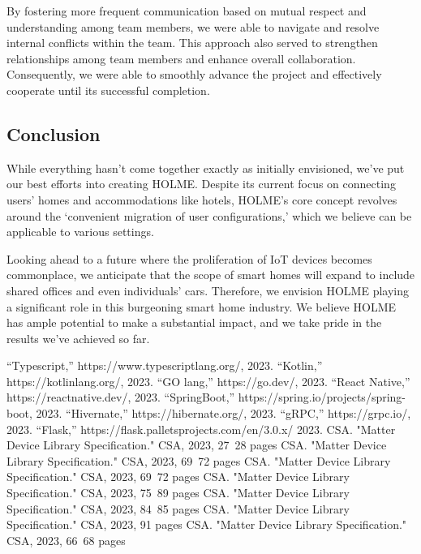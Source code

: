 \documentclass[conference]{IEEEtran}
\begin{document}
By fostering more frequent communication based on mutual respect and understanding among team members, we were able to navigate and resolve internal conflicts within the team. This approach also served to strengthen relationships among team members and enhance overall collaboration. Consequently, we were able to smoothly advance the project and effectively cooperate until its successful completion.\\

\subsection{Conclusion}

While everything hasn't come together exactly as initially envisioned, we've put our best efforts into creating HOLME. Despite its current focus on connecting users' homes and accommodations like hotels, HOLME's core concept revolves around the `convenient migration of user configurations,' which we believe can be applicable to various settings.

Looking ahead to a future where the proliferation of IoT devices becomes commonplace, we anticipate that the scope of smart homes will expand to include shared offices and even individuals' cars. Therefore, we envision HOLME playing a significant role in this burgeoning smart home industry. We believe HOLME has ample potential to make a substantial impact, and we take pride in the results we've achieved so far. \\

\begin{thebibliography}{9}
  “Typescript,” https://www.typescriptlang.org/, 2023.
  “Kotlin,” https://kotlinlang.org/, 2023.
  “GO lang,” https://go.dev/, 2023.
  “React Native,” https://reactnative.dev/, 2023.
  “SpringBoot,” https://spring.io/projects/spring-boot, 2023.
  “Hivernate,” https://hibernate.org/, 2023.
  “gRPC,” https://grpc.io/, 2023.
  “Flask,” https://flask.palletsprojects.com/en/3.0.x/ 2023.
 CSA. "Matter Device Library Specification." CSA, 2023, 27~28 pages
 CSA. "Matter Device Library Specification." CSA, 2023, 69~72 pages
 CSA. "Matter Device Library Specification." CSA, 2023, 69~72 pages
 CSA. "Matter Device Library Specification." CSA, 2023, 75~89 pages
 CSA. "Matter Device Library Specification." CSA, 2023, 84~85 pages
 CSA. "Matter Device Library Specification." CSA, 2023, 91 pages
 CSA. "Matter Device Library Specification." CSA, 2023, 66~68 pages

\end{thebibliography}
\end{document}
